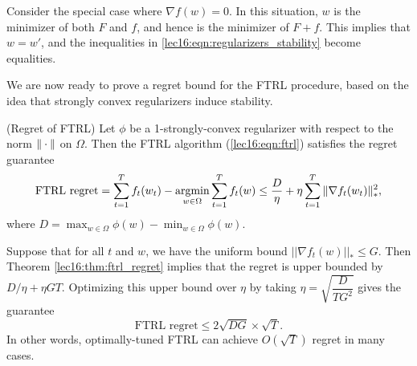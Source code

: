 \begin{remark}
Consider the special case where $\nabla f(w) = 0$. In this situation, $w$ is the minimizer of both $F$ and $f$, and hence is the minimizer of $F + f$. This implies that $w = w'$, and the inequalities in \eqref{lec16:eqn:regularizers_stability} become equalities.
\end{remark}

We are now ready to prove a regret bound for the FTRL procedure, based on the idea that strongly convex regularizers induce stability.

\begin{theorem}\label{lec16:thm:ftrl_regret}
\textup{(Regret of FTRL)} Let $\phi$ be a 1-strongly-convex regularizer with respect to the norm $\|\cdot\|$ on $\Omega$.  Then the FTRL algorithm (\ref{lec16:eqn:ftrl}) satisfies the regret guarantee
\begin{align}
\text{FTRL regret} = \sum_{t = 1}^T f_t(w_t) - \operatorname*{\textup{argmin}}_{w \in \Omega} \sum_{t = 1}^T f_t(w)  \leq \frac{D}{\eta} + \eta \sum_{t = 1}^T \|\nabla f_t(w_t)\|_*^2,
\end{align}
where $D = \max_{w \in \Omega} \phi(w) - \min_{w \in \Omega} \phi(w)$.
\end{theorem}

\begin{remark}
Suppose that for all $t$ and $w$, we have the uniform bound $|| \nabla f_t(w) ||_* \leq G$.  Then Theorem \ref{lec16:thm:ftrl_regret} implies that the regret is upper bounded by $D / \eta + \eta G T$.  Optimizing this upper bound over $\eta$ by taking $\eta = \sqrt{\dfrac{D}{TG^2}}$ gives the guarantee
\begin{equation}\label{lec17:eqn:ftrl-regret-ub}
\text{FTRL regret} \leq 2 \sqrt{D G} \times \sqrt{T}.
\end{equation}
In other words, optimally-tuned FTRL can achieve $O(\sqrt{T})$ regret in many cases.
\end{remark}

